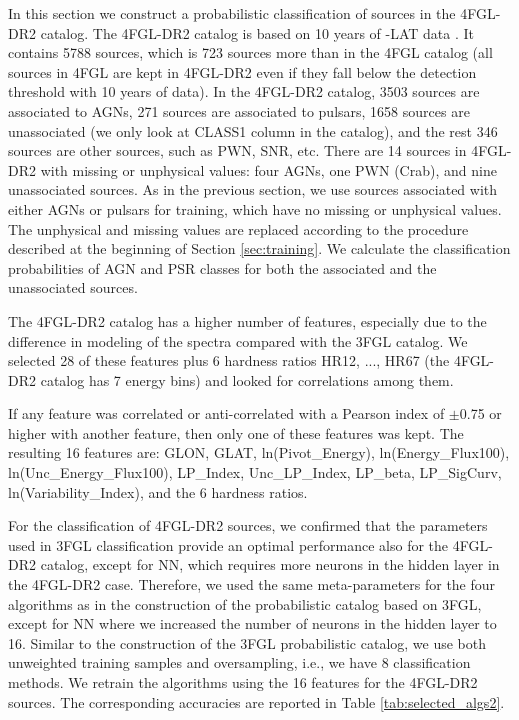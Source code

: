 In this section we construct a probabilistic classification of sources in the 4FGL-DR2 catalog. The 4FGL-DR2 catalog \citep{2020arXiv200511208B} 
is based on 10 years of \Fermi-LAT data \citep[compared to 8 years of data in the 4FGL catalog,][]{2020ApJS..247...33A}.
It contains 5788 sources, which is 723 sources more than in the 4FGL catalog (all sources in 4FGL are kept in 4FGL-DR2 even if they fall
below the detection threshold with 10 years of data). 
In the 4FGL-DR2 catalog,
3503 sources are associated to AGNs,
271 sources are associated to pulsars,
1658 sources are unassociated (we only look at CLASS1 column in the catalog), 
and the rest 346 sources are other sources, such as PWN, SNR, etc.
There are 14 sources in 4FGL-DR2 with missing or unphysical values: four AGNs, one PWN (Crab), and nine unassociated sources.
As in the previous section, we use sources associated with either AGNs or pulsars for training,
which have no missing or unphysical values.
The unphysical and missing values are replaced according to the procedure described at the beginning of Section \ref{sec:training}.
We calculate the classification probabilities of AGN and PSR classes for both the associated and the unassociated sources.

The 4FGL-DR2 catalog has a higher number of features, especially due to the difference in modeling of the spectra compared with the 3FGL catalog. 
We selected 28 of these features plus 6 hardness ratios HR12, ..., HR67 (the 4FGL-DR2 catalog has 7 energy bins)
and looked for correlations among them. 

If any feature was correlated or anti-correlated with a Pearson index of $\pm$0.75 or higher with another feature, then only one of these features was kept. 
The resulting 16 features are:
GLON, GLAT, ln(Pivot\_Energy), ln(Energy\_Flux100), ln(Unc\_Energy\_Flux100), LP\_Index, Unc\_LP\_Index, LP\_beta, LP\_SigCurv, ln(Variability\_Index), and the 6 hardness ratios.

For the classification of 4FGL-DR2 sources, we confirmed that the parameters used in 3FGL classification provide an optimal performance also for the 4FGL-DR2 catalog, except for NN, which requires more neurons in the hidden layer in the 4FGL-DR2 case.
Therefore, we used the same meta-parameters for the four algorithms as in the construction of the probabilistic catalog based on 3FGL, except for NN where we increased the number of neurons in the hidden layer to 16. Similar to the construction of the 3FGL probabilistic catalog, we use both unweighted training samples and oversampling, i.e., we have 8 classification methods.
We retrain the algorithms using the 16 features for the 4FGL-DR2 sources.
The corresponding accuracies are reported in Table \ref{tab:selected_algs2}.



